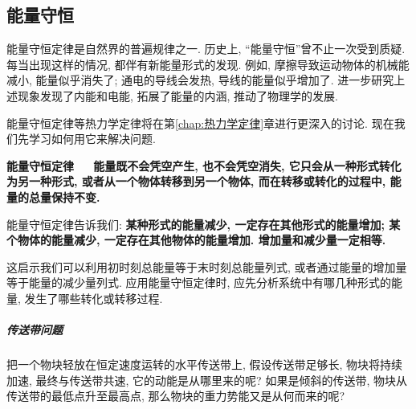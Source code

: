 \documentclass[UTF8,openany,fontset=fandol]{ctexbook}
\theoremstyle{chinesetextbook}
\newcommand{\bre}{\ \ \ }
\begin{document}
\subsection{能量守恒}
能量守恒定律是自然界的普遍规律之一. 历史上, “能量守恒”曾不止一次受到质疑. 每当出现这样的情况, 都伴有新能量形式的发现. 例如, 摩擦导致运动物体的机械能减小, 能量似乎消失了; 通电的导线会发热, 导线的能量似乎增加了. 进一步研究上述现象发现了内能和电能, 拓展了能量的内涵, 推动了物理学的发展.

能量守恒定律等热力学定律将在第\ref{chap:热力学定律}章进行更深入的讨论. 现在我们先学习如何用它来解决问题.

\textbf{能量守恒定律\bre 能量既不会凭空产生, 也不会凭空消失, 它只会从一种形式转化为另一种形式, 或者从一个物体转移到另一个物体, 而在转移或转化的过程中, 能量的总量保持不变.}

能量守恒定律告诉我们: \textbf{某种形式的能量减少, 一定存在其他形式的能量增加; 某个物体的能量减少, 一定存在其他物体的能量增加. 增加量和减少量一定相等.}

这启示我们可以利用初时刻总能量等于末时刻总能量列式, 或者通过能量的增加量等于能量的减少量列式. 应用能量守恒定律时, 应先分析系统中有哪几种形式的能量, 发生了哪些转化或转移过程.

\subparagraph{传送带问题} 把一个物块轻放在恒定速度运转的水平传送带上, 假设传送带足够长, 物块将持续加速, 最终与传送带共速, 它的动能是从哪里来的呢? 如果是倾斜的传送带, 物块从传送带的最低点升至最高点, 那么物块的重力势能又是从何而来的呢?
\end{document}
